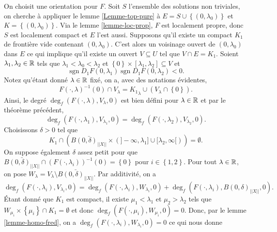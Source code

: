 \documentclass[memoire.tex]{subfiles}
\begin{document}
\begin{preuve}
    On choisit une orientation pour $F$. Soit $S$ l'ensemble des solutions non triviales, on cherche à appliquer le lemme \ref{Lemme-top-pure} à $E=S\cup \left\{ (0,\lambda_0)\right\}$ et $K=\left\{(0,\lambda_0)\right\}$. Via le lemme \ref{lemme-loc-prop}, $F$ est localement propre, donc $S$ est localement compact et $E$ l'est aussi. Supposons qu'il existe un compact $K_1$ de frontière vide contenant $(0,\lambda_0)$. C'est alors un voisinage ouvert de $(0,\lambda_0)$ dans $E$ ce qui implique qu'il existe un ouvert $V\subseteq U$ tel que $V\cap E=K_1$. Soient $\lambda_1,\lambda_2\in \mathbb{R}$ tels que $\lambda_1<\lambda_0<\lambda_2$ et $\left\{0\right\}\times[\lambda_1,\lambda_2] \subseteq V$ et
    \begin{equation*}
        \operatorname{sgn}D_1F(0,\lambda_1)\operatorname{sgn}D_1F(0,\lambda_2)<0.
    \end{equation*}
    Notez qu'étant donné $\lambda\in\mathbb{R}$ fixé, on a, avec des notations évidentes,
    \begin{equation*}
        F(\cdot,\lambda)^{-1}(0)\cap V_{\lambda}=
        {K_1}_{\lambda}\cup (V_{\lambda}\cap \left\{0\right\}).
    \end{equation*}
    Ainsi, le degré $\deg_f(F(\cdot,\lambda),V_{\lambda},0)$ est bien défini pour $\lambda\in\mathbb{R}$ et par le théorème précédent,
    \begin{equation*}
        \deg_f(F(\cdot,\lambda_1),V_{\lambda_1},0)=\deg_f(F(\cdot,\lambda_2),V_{\lambda_2},0).
    \end{equation*}
    Choisissons $\delta>0$ tel que
    \begin{equation*}
        K_1\cap (\bar{B(0,\delta)_{||X||}}\times (]-\infty,\lambda_1]\cup[\lambda_2,\infty[))=\emptyset.
    \end{equation*}
    On suppose également $\delta$ assez petit pour que $\bar{B(0,\delta)_{||X||}}\cap (F(\cdot, \lambda_i))^{-1}(0)=\left\{0\right\}$ pour $i\in\left\{1,2\right\}$. Pour tout $\lambda\in\mathbb{R}$, on pose $W_{\lambda}=V_{\lambda}\setminus \bar{B(0,\delta)_{||X||}}$. Par additivité, on a
    \begin{equation*}
        \deg_f(F(\cdot,\lambda_i),V_{\lambda_i},0)
        =\deg_f(F(\cdot,\lambda_i),W_{\lambda_i},0)+
        \deg_f(F(\cdot,\lambda_i),B(0,\delta)_{||X||},0).
    \end{equation*}
    Étant donné que $K_1$ est compact, il existe $\mu_1<\lambda_1$ et $\mu_2>\lambda_2$ tels que $W_{\mu_i}\times\left\{\mu_i\right\} \cap K_1=\emptyset$ et donc $\deg_f(F(\cdot,\mu_i),W_{\mu_i},0)=0$. Donc, par le lemme \ref{lemme-homo-fred},  on a $\deg_f(F(\cdot,\lambda_i),W_{\lambda_i},0)=0$ ce qui nous donne

\end{preuve}
\end{document}
